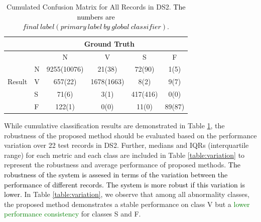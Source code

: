 \begin{table}[t]
	\centering
	\caption{Cumulated Confusion Matrix for All Records in DS2. \textcolor{black}{The numbers are $final~label(primary~label~by~global~ classifier)$}.}
	\vspace{-0.05in}
	\begin{tabular}{|l|l|c|c|c|c|}
		\hline 
		&  \multicolumn{5}{c|}{Ground Truth} \\ 
        \hline
		\multirow{5}{*}{Result} &  & N & V & S & F  \\\cline{2-6}
		& N & 9255(10076)& 21(38) & 72(90) & 1(5) \\\cline{2-6} 
		&V & 657(22) & 1678(1663) & 8(2) & 9(7)  \\\cline{2-6}
		&S & 71(6) & 3(1) & 417(416) & 0(0)  \\\cline{2-6}
        &F& 122(1) & 0(0) & 11(0) & 89(87)  \\\hline
	\end{tabular}
	\label{table:classification_cumu} 
\end{table}

While cumulative classification results are demonstrated in Table \ref{table:classification_cumu}, the robustness of the proposed method should be evaluated based on the performance variation over 22 test records in DS2. Further, medians and IQRs (interquartile range) for each metric and each class are included in Table \ref{table:variation} to represent the robustness and average performance of proposed methods. \textcolor{black}{The robustness of the system is assesed in terms of the variation between the performance of different records. The system is more robust if this variation is lower.} 
In Table \ref{table:variation}, we observe that among all abnormality classes,  %
the proposed method demonstrates a stable performance on class V but a \textcolor{green}{lower performance consistency} for classes S and F.



